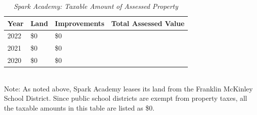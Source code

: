 \begin{table}[hbtp]
  \SingleSpacing%
  \caption[Spark Academy: Taxable Amount of Assessed Propery]{\textit{Spark Academy: Taxable Amount of Assessed Property}}\label{tab:spark-academy-taxable-amount}
  \begin{tabular}{llll}
    \toprule
    Year & Land        & Improvements & Total Assessed Value \\
    \midrule
    2022 & \$0         & \$0          & \\
    2021 & \$0         & \$0          & \\
    2020 & \$0         & \$0          & \\
    \bottomrule
  \end{tabular}\\
  \noindent\footnotesize{Note: As noted above, Spark Academy leases its land from the Franklin McKinley School District. Since public school districts are exempt from property taxes, all the taxable amounts in this table are listed as \$0.}
\end{table}

